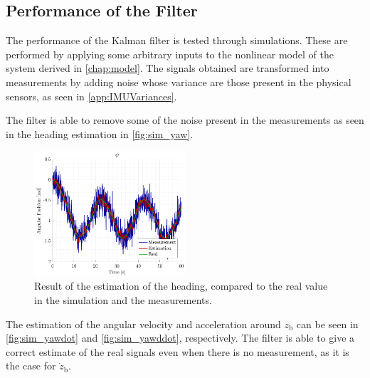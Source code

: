\subsection{Performance of the Filter}
The performance of the Kalman filter is tested through simulations. These are performed by applying some arbitrary inputs to the nonlinear model of the system derived in \autoref{chap:model}. The signals obtained are transformed into measurements by adding noise whose variance are those present in the physical sensors, as seen in \autoref{app:IMUVariances}.

The filter is able to remove some of the noise present in the measurements as seen in the heading estimation in \autoref{fig:sim_yaw}.
\begin{figure}[H]
    \includegraphics[width=0.5\textwidth]{figures/sim_yaw}
    \caption{Result of the estimation of the heading, compared to the real value in the simulation and the measurements.}
    \label{fig:sim_yaw}
\end{figure}
%
The estimation of the angular velocity and acceleration around $z_\mathrm{b}$ can be seen in \autoref{fig:sim_yawdot} and \ref{fig:sim_yawddot}, respectively. The filter is able to give a correct estimate of the real signals even when there is no measurement, as it is the case for $\dot{z}_\mathrm{b}$.
%
